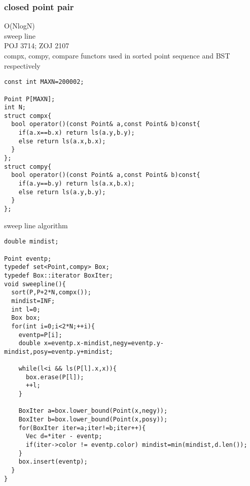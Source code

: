 \documentclass[a4paper]{article}
\begin{document}
\subsubsection{closed point pair}
O(NlogN) \\
sweep line \\ 
POJ 3714; ZOJ 2107 \\
compx, compy, compare functors used in sorted point sequence and BST respectively
\begin{lstlisting}
const int MAXN=200002;

Point P[MAXN];
int N;
struct compx{
  bool operator()(const Point& a,const Point& b)const{
    if(a.x==b.x) return ls(a.y,b.y);
    else return ls(a.x,b.x);
  }
};
struct compy{
  bool operator()(const Point& a,const Point& b)const{
    if(a.y==b.y) return ls(a.x,b.x);
    else return ls(a.y,b.y);
  }
};
\end{lstlisting}
sweep line algorithm
\begin{lstlisting}
double mindist;

Point eventp;
typedef set<Point,compy> Box;
typedef Box::iterator BoxIter;
void sweepline(){
  sort(P,P+2*N,compx());
  mindist=INF;
  int l=0;
  Box box;
  for(int i=0;i<2*N;++i){
    eventp=P[i];
    double x=eventp.x-mindist,negy=eventp.y-mindist,posy=eventp.y+mindist;

    while(l<i && ls(P[l].x,x)){
      box.erase(P[l]);
      ++l;
    }
    
    BoxIter a=box.lower_bound(Point(x,negy));
    BoxIter b=box.lower_bound(Point(x,posy));
    for(BoxIter iter=a;iter!=b;iter++){
      Vec d=*iter - eventp;
      if(iter->color != eventp.color) mindist=min(mindist,d.len());
    }
    box.insert(eventp);
  }
}
\end{lstlisting}
\end{document}
